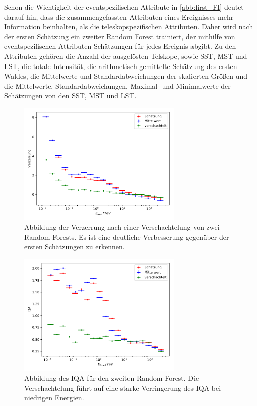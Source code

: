 Schon die Wichtigkeit der eventspezifischen Attribute in \autoref{abb:first_FI} deutet darauf hin, dass die zusammengefassten Attributen eines Ereignisses
mehr Information beinhalten, als die teleskopspezifischen Attributen.
Daher wird nach der ersten Schätzung ein zweiter Random Forest trainiert, der mithilfe von eventspezifischen Attributen Schätzungen für jedes Ereignis abgibt.
Zu den Attributen gehören die Anzahl der ausgelösten Telskope, sowie SST, MST und LST, die totale Intensität, die arithmetisch gemittelte Schätzung des
ersten Waldes, die Mittelwerte und Standardabweichungen der skalierten Größen und die Mittelwerte, Standardabweichungen, Maximal- und Minimalwerte der
Schätzungen von den SST, MST und LST.
\begin{figure}
  \includegraphics[width=0.7\textwidth]{Plots/RF_nested_bias.pdf}
  \centering
  \caption{Abbildung der Verzerrung nach einer Verschachtelung von zwei Random Forests. Es ist eine deutliche Verbesserung gegenüber der ersten Schätzungen
            zu erkennen.}
  \label{abb:nest_bias}
\end{figure}
\begin{figure}
  \includegraphics[width=0.7\textwidth]{Plots/RF_nested_resolution.pdf}
  \centering
  \caption{Abbildung des IQA für den zweiten Random Forest. Die Verschachtelung führt auf eine starke Verringerung des IQA bei niedrigen Energien.}
  \label{abb:nest_IQA}
\end{figure}

